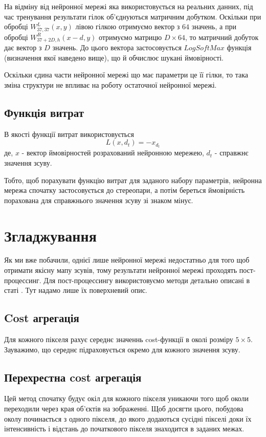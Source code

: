 \documentclass{article}
\theoremstyle{definition}
\begin{document}
На відміну від нейронної мережі яка використовується на реальних данних, під час тренування результати гілок об'єднуються матричним добутком. Оскільки при обробці $W^L_{37,37}(x,y)$ лівою гілкою отримуємо вектор з $64$ значень, а при обробці $W^R_{37 + 2D,h}(x - d,y)$  отримуємо матрицю $D \times 64$, то матричний добуток дає вектор з $D$ значень. До цього вектора застосовується $LogSoftMax$ функція (визначення якої наведено вище), що й обчислює шукані ймовірності.

Оскільки єдина части нейронної мережі що має параметри це її гілки, то така зміна структури не впливає на роботу остаточної нейронної мережі.

\subsection{Функція витрат}
В якості функції витрат використовується
\[ L(x, d_t) = -x_{d_t} \]
де, $x$ - вектор ймовірностей розрахований нейронною мережею, $d_t$ - справжнє значення зсуву.

Тобто, щоб порахувати функцію витрат для заданого набору параметрів, нейронна мережа спочатку застосовується до стереопари, а потім береться ймовірність порахована для справжнього значення зсуву зі знаком мінус.

\section{Згладжування}
Як ми вже побачили, однієї лише нейронної мережі недостатньо для того щоб отримати якісну мапу зсувів, тому результати нейронної мережі проходять пост-процессинг. Для пост-процессингу використовуємо методи детально описані в статі \cite{zbontar2016stereo}. Тут надамо лише їх поверхневий опис.

\subsection{Cost агрегація}
Для кожного пікселя рахує середнє значеннь cost-функції в околі розміру $5 \times 5$. Зауважимо, що середнє підраховується окремо для кожного значення зсуву.

\subsection{Перехрестна cost агрегація}
Цей метод спочатку будує окіл для кожного пікселя уникаючи того щоб околи переходили через края об'єктів на зображенні. Щоб досягти цього,  побудова околу починається з одного пікселя, до якого додаються сусідні пікселі доки їх інтенсивність і відстань до початкового пікселя знаходится в заданих межах.
\end{document}
